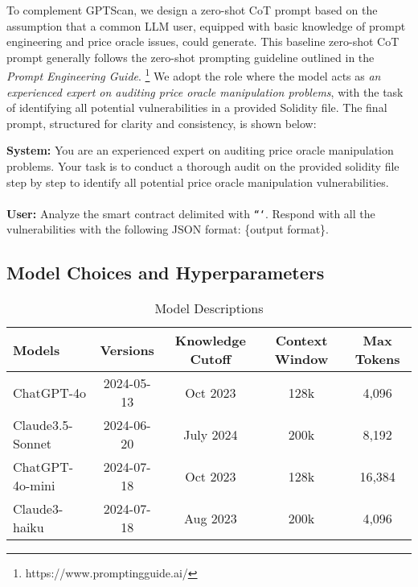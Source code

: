 To complement GPTScan, we design a zero-shot CoT prompt based on the assumption that a common LLM user, equipped with basic knowledge of prompt engineering and price oracle issues, could generate.
This baseline zero-shot CoT prompt generally follows the zero-shot prompting guideline outlined in the \textit{Prompt Engineering Guide}. \footnote{https://www.promptingguide.ai/}
We adopt the role where the model acts as \textit{an experienced expert on auditing price oracle manipulation problems}, with the task of identifying all potential vulnerabilities in a provided Solidity file.
The final prompt, structured for clarity and consistency, is shown below:

\begin{tcolorbox}[colback=gray!20, colframe=gray!50, title={Zero-shot CoT Prompt}, label=simplebaseline]
\textbf{System:} You are an experienced expert on auditing price oracle manipulation problems. Your task is to conduct a thorough audit on the provided solidity file step by step to identify all potential price oracle manipulation vulnerabilities. \\
\\
\textbf{User:} Analyze the smart contract delimited with \texttt{```}. Respond with all the vulnerabilities with the following JSON format: \{output format\}.
\end{tcolorbox}


\subsection{Model Choices and Hyperparameters} \label{subsec:settings}

\begin{table}
    \caption{Model Descriptions}
    \label{table:models}
    \begin{tabular}{@{}lcccc@{}}
    \toprule
    Models & Versions         & Knowledge Cutoff & Context Window & Max Tokens \\ \midrule
    ChatGPT-4o & 2024-05-13 & Oct 2023         & 128k         & 4,096       \\
    Claude3.5-Sonnet & 2024-06-20 & July 2024        & 200k         & 8,192         \\
    ChatGPT-4o-mini  &  2024-07-18    &  Oct 2023         & 128k       & 16,384      \\ 
    Claude3-haiku  &  2024-07-18    & Aug 2023        & 200k       & 	4,096       \\ \bottomrule
    \end{tabular}%
\end{table}

